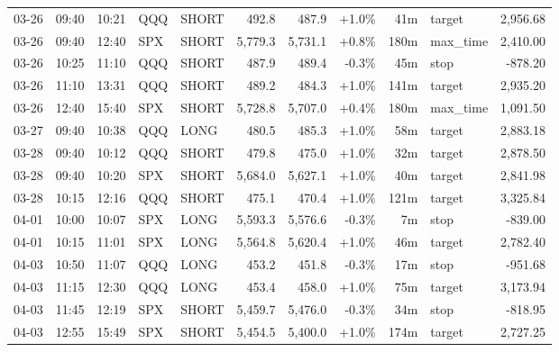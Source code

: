 \documentclass[11pt,a4paper,twoside]{article}
\begin{document}
\begin{center}
\begin{longtable}{>{\color{txtmain}}l l l l l r r r r >{\color{txtmain}}l r}
03-26 & 09:40 & 10:21 & QQQ & SHORT & 492.8 & 487.9 & \textcolor{wingreen}{+1.0\%} & 41m & target & \textcolor{wingreen}{2,956.68} \\
03-26 & 09:40 & 12:40 & SPX & SHORT & 5,779.3 & 5,731.1 & \textcolor{wingreen}{+0.8\%} & 180m & max\_time & \textcolor{wingreen}{2,410.00} \\
03-26 & 10:25 & 11:10 & QQQ & SHORT & 487.9 & 489.4 & \textcolor{lossred}{-0.3\%} & 45m & stop & \textcolor{lossred}{-878.20} \\
03-26 & 11:10 & 13:31 & QQQ & SHORT & 489.2 & 484.3 & \textcolor{wingreen}{+1.0\%} & 141m & target & \textcolor{wingreen}{2,935.20} \\
03-26 & 12:40 & 15:40 & SPX & SHORT & 5,728.8 & 5,707.0 & \textcolor{wingreen}{+0.4\%} & 180m & max\_time & \textcolor{wingreen}{1,091.50} \\
03-27 & 09:40 & 10:38 & QQQ & LONG & 480.5 & 485.3 & \textcolor{wingreen}{+1.0\%} & 58m & target & \textcolor{wingreen}{2,883.18} \\
03-28 & 09:40 & 10:12 & QQQ & SHORT & 479.8 & 475.0 & \textcolor{wingreen}{+1.0\%} & 32m & target & \textcolor{wingreen}{2,878.50} \\
03-28 & 09:40 & 10:20 & SPX & SHORT & 5,684.0 & 5,627.1 & \textcolor{wingreen}{+1.0\%} & 40m & target & \textcolor{wingreen}{2,841.98} \\
03-28 & 10:15 & 12:16 & QQQ & SHORT & 475.1 & 470.4 & \textcolor{wingreen}{+1.0\%} & 121m & target & \textcolor{wingreen}{3,325.84} \\
04-01 & 10:00 & 10:07 & SPX & LONG & 5,593.3 & 5,576.6 & \textcolor{lossred}{-0.3\%} & 7m & stop & \textcolor{lossred}{-839.00} \\
04-01 & 10:15 & 11:01 & SPX & LONG & 5,564.8 & 5,620.4 & \textcolor{wingreen}{+1.0\%} & 46m & target & \textcolor{wingreen}{2,782.40} \\
04-03 & 10:50 & 11:07 & QQQ & LONG & 453.2 & 451.8 & \textcolor{lossred}{-0.3\%} & 17m & stop & \textcolor{lossred}{-951.68} \\
04-03 & 11:15 & 12:30 & QQQ & LONG & 453.4 & 458.0 & \textcolor{wingreen}{+1.0\%} & 75m & target & \textcolor{wingreen}{3,173.94} \\
04-03 & 11:45 & 12:19 & SPX & SHORT & 5,459.7 & 5,476.0 & \textcolor{lossred}{-0.3\%} & 34m & stop & \textcolor{lossred}{-818.95} \\
04-03 & 12:55 & 15:49 & SPX & SHORT & 5,454.5 & 5,400.0 & \textcolor{wingreen}{+1.0\%} & 174m & target & \textcolor{wingreen}{2,727.25} \\

\end{longtable}
\end{center}
\end{document}
